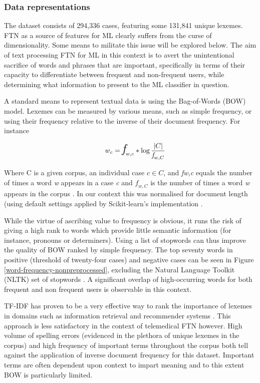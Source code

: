 \subsubsection{Data representations}
 
The dataset consists of 294,336 cases, featuring some 131,841 unique lexemes. FTN as a source of features for ML clearly suffers from the curse of dimensionality. Some means to militate this issue will be explored below. The aim of text processing FTN for ML in this context is to avert the unintentional sacrifice of words and phrases that are important, specifically in terms of their capacity to differentiate between frequent and non-frequent users, while determining what information to present to the ML classifier in question.


A standard means to represent textual data is using the Bag-of-Words (BOW) model. Lexemes can be measured by various means, such as simple frequency, or using their frequency relative to the inverse of their document frequency. For instance

\begin{align}
\hspace*{5mm}w_{c} = {\textit{\LARGE f}} _{w,c} * \log \frac{|C|}{\textit{f} _{w,C}}
\end{align}

Where C is a given corpus, an individual case $c \in C$, and  \textit{fw,c} equals the number of times a word \textit{w} appears in a case \textit{c} and $\textit{f}_{w,C}$ is the number of times a word \textit{w} appears in the corpus \cite{salton1988term}. In our context this was normalised for document length (using default settings applied by Scikit-learn's implementation \cite{scikit-learn}. 

While the virtue of ascribing value to frequency is obvious, it runs the risk of giving a high rank to words which provide little semantic information (for instance, pronouns or determiners). Using a list of stopwords can thus improve the quality of BOW ranked by simple frequency. The top seventy words in positive (threshold of twenty-four cases) and negative cases can be seen in Figure \ref{word-frequency-nonpreprocessed}, excluding the Natural Language Toolkit (NLTK) set of stopwords \cite{bird2009natural}. A significant overlap of high-occurring words for both frequent and non frequent users is observable in this context.  

TF-IDF has proven to be a very effective way to rank the importance of lexemes in domains such as information retrieval and recommender systems \cite{ramos2003using}. This approach is less satisfactory in the context of telemedical FTN however. High volume of spelling errors (evidenced in the plethora of unique lexemes in the corpus) and high frequency of important terms throughout the corpus both tell against the application of inverse document frequency for this dataset. Important terms are often dependent upon context to impart meaning and to this extent BOW is particularly limited. 

